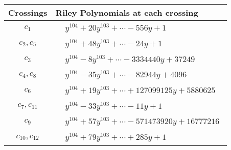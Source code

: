 \documentclass[1p]{elsarticle_modified}
\theoremstyle{definition}
\begin{document}
\begin{tabular}{m{50pt}|m{274pt}}
Crossings & \hspace{64pt}Riley Polynomials at each crossing \\
\hline $$\begin{aligned}c_{1}\end{aligned}$$&$\begin{aligned}
&y^{104}+20 y^{103}+\cdots-556 y+1
\end{aligned}$\\
\hline $$\begin{aligned}c_{2},c_{5}\end{aligned}$$&$\begin{aligned}
&y^{104}+48 y^{103}+\cdots-24 y+1
\end{aligned}$\\
\hline $$\begin{aligned}c_{3}\end{aligned}$$&$\begin{aligned}
&y^{104}-8 y^{103}+\cdots-3334440 y+37249
\end{aligned}$\\
\hline $$\begin{aligned}c_{4},c_{8}\end{aligned}$$&$\begin{aligned}
&y^{104}-35 y^{103}+\cdots-82944 y+4096
\end{aligned}$\\
\hline $$\begin{aligned}c_{6}\end{aligned}$$&$\begin{aligned}
&y^{104}+19 y^{103}+\cdots+127099125 y+5880625
\end{aligned}$\\
\hline $$\begin{aligned}c_{7},c_{11}\end{aligned}$$&$\begin{aligned}
&y^{104}-33 y^{103}+\cdots-11 y+1
\end{aligned}$\\
\hline $$\begin{aligned}c_{9}\end{aligned}$$&$\begin{aligned}
&y^{104}+57 y^{103}+\cdots-571473920 y+16777216
\end{aligned}$\\
\hline $$\begin{aligned}c_{10},c_{12}\end{aligned}$$&$\begin{aligned}
&y^{104}+79 y^{103}+\cdots+285 y+1
\end{aligned}$\\
\hline
\end{tabular}\\~\\
\end{document}
